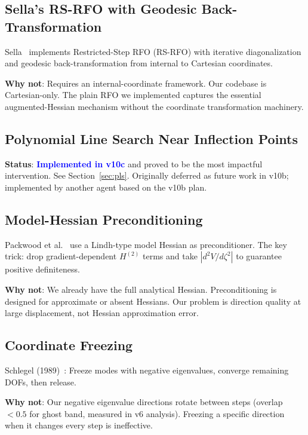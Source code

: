\documentclass[11pt,a4paper]{article}
\theoremstyle{definition}
\begin{document}
\subsection{Sella's RS-RFO with Geodesic Back-Transformation}
\label{sec:sella}

Sella~\citep{sella} implements Restricted-Step RFO (RS-RFO) with iterative
diagonalization and geodesic back-transformation from internal to Cartesian
coordinates.

\textbf{Why not}: Requires an internal-coordinate framework.  Our codebase is
Cartesian-only.  The plain RFO we implemented captures the essential
augmented-Hessian mechanism without the coordinate transformation machinery.

\subsection{Polynomial Line Search Near Inflection Points}

\textbf{Status}: \textcolor{blue}{\textbf{Implemented in v10c}} and
proved to be the most impactful intervention.  See
Section~\ref{sec:pls}.  Originally deferred as future work in v10b;
implemented by another agent based on the v10b plan.

\subsection{Model-Hessian Preconditioning}

Packwood et al.~\citep{packwood2018} use a Lindh-type model Hessian as
preconditioner.  The key trick: drop gradient-dependent $H^{(2)}$ terms and
take $|d^2V/d\zeta^2|$ to guarantee positive definiteness.

\textbf{Why not}: We already have the full analytical Hessian.
Preconditioning is designed for approximate or absent Hessians.  Our problem
is direction quality at large displacement, not Hessian approximation error.

\subsection{Coordinate Freezing}

Schlegel (1989)~\citep{schlegel1989}: Freeze modes with negative eigenvalues,
converge remaining DOFs, then release.

\textbf{Why not}: Our negative eigenvalue directions rotate between steps
(overlap $< 0.5$ for ghost band, measured in v6 analysis).  Freezing a
specific direction when it changes every step is ineffective.
\end{document}

